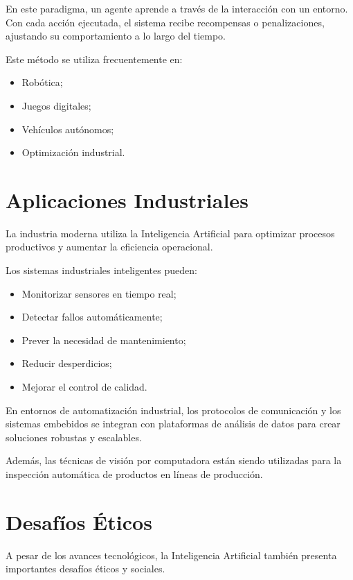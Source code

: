 \documentclass[11pt]{article}
\begin{document}
En este paradigma, un agente aprende a través de la interacción con un entorno. Con cada acción
ejecutada, el sistema recibe recompensas o penalizaciones, ajustando su comportamiento a lo
largo del tiempo.

Este método se utiliza frecuentemente en:

\begin{itemize}
    \item Robótica;
    \item Juegos digitales;
    \item Vehículos autónomos;
    \item Optimización industrial.
\end{itemize} 

\section{Aplicaciones Industriales}

La industria moderna utiliza la Inteligencia Artificial para optimizar procesos productivos y aumentar
la eficiencia operacional.

Los sistemas industriales inteligentes pueden:

\begin{itemize}
    \item Monitorizar sensores en tiempo real;
    \item Detectar fallos automáticamente;
    \item Prever la necesidad de mantenimiento;
    \item Reducir desperdicios;
    \item Mejorar el control de calidad.
\end{itemize}

En entornos de automatización industrial, los protocolos de comunicación y los sistemas embebidos se
integran con plataformas de análisis de datos para crear soluciones robustas y escalables.
 
Además, las técnicas de visión por computadora están siendo utilizadas para la inspección automática de
productos en líneas de producción.

\section{Desafíos Éticos}

A pesar de los avances tecnológicos, la Inteligencia Artificial también presenta importantes desafíos éticos y
sociales.
\end{document}

